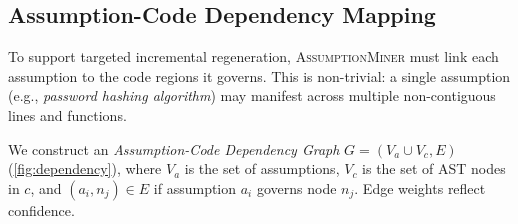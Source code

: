\documentclass[sigconf,review,anonymous]{acmart}
\newcommand{\sysname}{\textsc{AssumptionMiner}\xspace}
\begin{document}
\subsection{Assumption-Code Dependency Mapping}
\label{sec:dependency}

To support targeted incremental regeneration, \sysname must link each assumption to the
code regions it governs.  This is non-trivial: a single assumption (e.g., \emph{password
hashing algorithm}) may manifest across multiple non-contiguous lines and functions.

We construct an \emph{Assumption-Code Dependency Graph} $G = (V_a \cup V_c, E)$
(\cref{fig:dependency}), where $V_a$ is the set of assumptions, $V_c$ is the set of
AST nodes in $c$, and $(a_i, n_j) \in E$ if assumption $a_i$ governs node $n_j$.
Edge weights reflect confidence.
\end{document}
